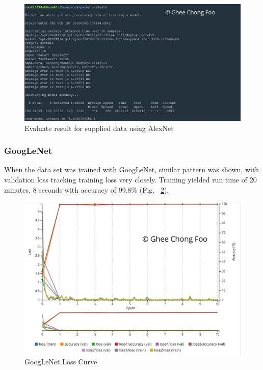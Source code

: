 \documentclass[10pt,journal,compsoc]{IEEEtran}
\begin{document}
\begin{figure}[thpb]
      \centering
      \includegraphics[width=\linewidth]{evaluate_AlexNet}
      \caption{Evaluate result for supplied data using AlexNet}
      \label{fig:evaluate_AlexNet}
\end{figure}

\subsubsection{GoogLeNet}
When the data set was trained with GoogLeNet, similar pattern was shown, with validation loss tracking training loss very closely.  Training yielded run time of 20 minutes, 8 seconds with accuracy of 99.8\% (Fig. ~\ref{fig:Goog_Epoch10_Batch25_lr001}).

\begin{figure}[thpb]
      \centering
      \includegraphics[width=\linewidth]{Goog_Epoch10_Batch25_lr001}
      \caption{GoogLeNet Loss Curve}
      \label{fig:Goog_Epoch10_Batch25_lr001}
\end{figure}
\end{document}
